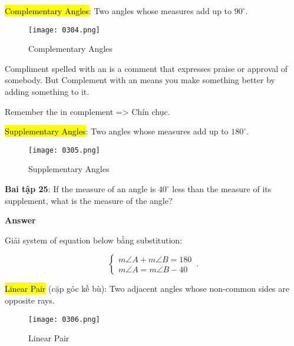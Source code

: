 \hl{Complementary Angles}: Two angles whose measures add up to $90^{\circ}$.

\begin{figure}[htb!]
  \centering
  \texttt{[image: 0304.png]}
  \caption{Complementary Angles}
\end{figure}

Compliment spelled with an  is a comment that expresses praise or approval of somebody. But Complement with an  means you make something better by adding something to it.

Remember the  in complement => Chín chục.

\vspace{10 mm}

\hl{Supplementary Angles}: Two angles whose measures add up to $180^{\circ}$.

\begin{figure}[htb!]
  \centering
  \texttt{[image: 0305.png]}
  \caption{Supplementary Angles}
\end{figure}

\textbf{Bai tập 25}: If the measure of an angle is $40^{\circ}$ less than the measure of its supplement, what is the measure of the angle?

\vspace{0.2 cm}

\centerline{\textbf{\normalsize Answer}}

\vspace{0.2 cm}

Giải system of equation below bằng substitution:

\begin{equation*}
    \begin{cases}
      m\angle A + m\angle B = 180\\
      m\angle A = m\angle B -40
    \end{cases}\,.
\end{equation*}

\vspace{5 cm}

\hl{Linear Pair} (cặp góc kề bù): Two adjacent angles whose non-common sides are opposite rays.

\begin{figure}[htb!]
  \centering
  \texttt{[image: 0306.png]}
  \caption{Linear Pair}
\end{figure}


